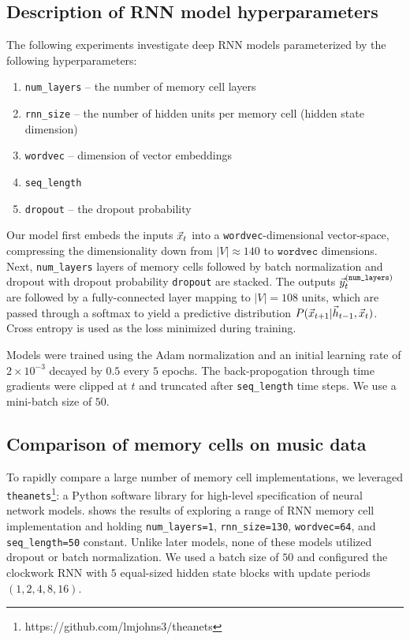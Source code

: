 \subsection{Description of RNN model hyperparameters}

The following experiments investigate deep RNN models parameterized by the
following hyperparameters:
\begin{enumerate}
  \item \texttt{num\_layers} -- the number of memory cell layers
  \item \texttt{rnn\_size} -- the number of hidden units per memory cell (\ie hidden state dimension)
  \item \texttt{wordvec} -- dimension of vector embeddings
  \item \texttt{seq\_length}
  \item \texttt{dropout} -- the dropout probability
\end{enumerate}


Our model first embeds the inputs $\vec{x}_t$ into a \texttt{wordvec}-dimensional
vector-space, compressing the dimensionality down from $|V| \approx 140$ to
$\texttt{wordvec}$ dimensions. Next, \texttt{num\_layers} layers of memory
cells followed by batch normalization \citep{ioffe2015batch} and dropout
\citep{srivastava2014dropout} with dropout probability \texttt{dropout} are
stacked. The outputs $\vec{y}^{(\texttt{num\_layers})}_t$ are followed by a
fully-connected layer mapping to $|V| = 108$ units, which are passed through a
softmax to yield a predictive distribution $P(\vec{x}_{t+1} | \vec{h}_{t-1}, \vec{x}_{t})$.
Cross entropy is used as the loss minimized during training.

Models were trained using the Adam normalization \citep{kingma2014adam}
and an initial learning rate of $2 \times 10^{-3}$ decayed by $0.5$ every $5$
epochs. The back-propogation through time gradients were clipped
at $t$\citep{Pascanu2012} and truncated after \texttt{seq\_length} time steps.
We use a mini-batch size of $50$.


\subsection{Comparison of memory cells on music data}

To rapidly compare a large number of memory cell implementations, we leveraged
\texttt{theanets}\footnote{https://github.com/lmjohns3/theanets}: a Python
software library for high-level specification of neural network models.
 shows the results of exploring a range of RNN
memory cell implementation and holding \texttt{num\_layers=1},
\texttt{rnn\_size=130}, \texttt{wordvec=64}, and \texttt{seq\_length=50}
constant. Unlike later models, none of these models utilized dropout or batch
normalization. We used a batch size of $50$ and configured the clockwork RNN
\citep{cho2014learning} with $5$ equal-sized hidden state blocks with update
periods $(1, 2, 4, 8, 16)$.

